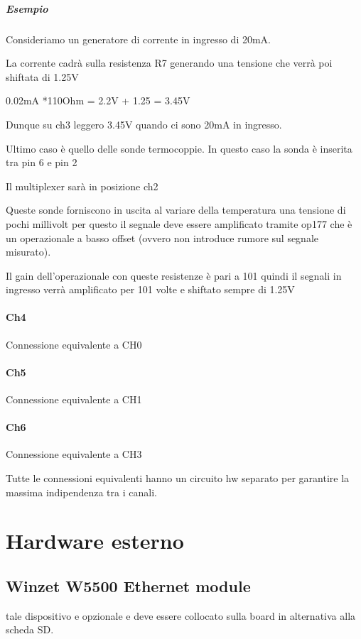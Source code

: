 \documentclass[12pt,a4paper]{report}
\begin{document}
\subparagraph{Esempio}

Consideriamo un generatore di corrente in ingresso di 20mA.

La corrente cadrà sulla resistenza R7 generando una tensione che verrà poi shiftata di 1.25V

0.02mA *110Ohm = 2.2V + 1.25 = 3.45V 

Dunque su ch3 leggero 3.45V quando ci sono 20mA in ingresso.

Ultimo caso è quello delle sonde termocoppie. In questo caso la sonda è inserita tra pin 6 e pin 2

Il multiplexer sarà in posizione ch2

Queste sonde forniscono in uscita al variare della temperatura una tensione di pochi millivolt per questo il segnale deve essere amplificato tramite op177 che è un operazionale a basso offset (ovvero non introduce rumore sul segnale misurato).

Il gain dell’operazionale con queste resistenze è pari a 101 quindi il segnali in ingresso verrà amplificato per 101 volte e shiftato sempre di 1.25V

\paragraph{Ch4}
Connessione equivalente a CH0 

\paragraph{Ch5}
Connessione equivalente a CH1

\paragraph{Ch6}
Connessione equivalente a CH3

Tutte le connessioni equivalenti hanno un circuito hw separato per garantire la massima indipendenza tra i canali.
\section{ Hardware esterno }

\subsection{Winzet W5500 Ethernet module}
tale dispositivo e opzionale e deve essere collocato sulla board in alternativa alla scheda SD.
\end{document}

